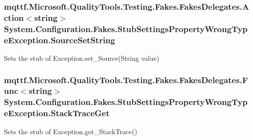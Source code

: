\hypertarget{class_system_1_1_configuration_1_1_fakes_1_1_stub_settings_property_wrong_type_exception_acee4960f768564746dd98d060980755b}{
\subsubsection[{Source\-Set\-String}]{\setlength{\rightskip}{0pt plus 5cm}mqttf.\-Microsoft.\-Quality\-Tools.\-Testing.\-Fakes.\-Fakes\-Delegates.\-Action$<$string$>$ System.\-Configuration.\-Fakes.\-Stub\-Settings\-Property\-Wrong\-Type\-Exception.\-Source\-Set\-String}}\label{class_system_1_1_configuration_1_1_fakes_1_1_stub_settings_property_wrong_type_exception_acee4960f768564746dd98d060980755b}


Sets the stub of Exception.\-set\-\_\-\-Source(\-String value)

\hypertarget{class_system_1_1_configuration_1_1_fakes_1_1_stub_settings_property_wrong_type_exception_a55a44e83b63c63e85137fcfa45c9d0fd}{
\subsubsection[{Stack\-Trace\-Get}]{\setlength{\rightskip}{0pt plus 5cm}mqttf.\-Microsoft.\-Quality\-Tools.\-Testing.\-Fakes.\-Fakes\-Delegates.\-Func$<$string$>$ System.\-Configuration.\-Fakes.\-Stub\-Settings\-Property\-Wrong\-Type\-Exception.\-Stack\-Trace\-Get}}\label{class_system_1_1_configuration_1_1_fakes_1_1_stub_settings_property_wrong_type_exception_a55a44e83b63c63e85137fcfa45c9d0fd}


Sets the stub of Exception.\-get\-\_\-\-Stack\-Trace()

